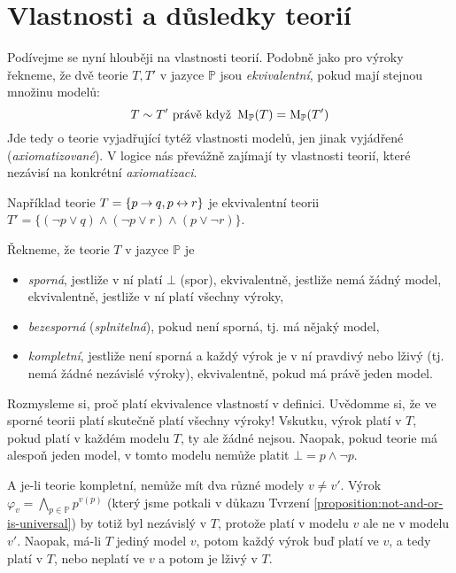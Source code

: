 \section{Vlastnosti a důsledky teorií}

Podívejme se nyní hlouběji na vlastnosti teorií. Podobně jako pro výroky řekneme, že dvě teorie $T,T'$ v jazyce $\mathbb P$ jsou \emph{ekvivalentní}, pokud mají stejnou množinu modelů:
$$
T\sim T' \text{ právě když } \operatorname{M}_\mathbb P(T)=\operatorname{M}_\mathbb P(T')
$$
Jde tedy o teorie vyjadřující tytéž vlastnosti modelů, jen jinak vyjádřené (\emph{axiomatizované}). V logice nás převážně zajímají ty vlastnosti teorií, které nezávisí na konkrétní \emph{axiomatizaci}.

\begin{example}
    Například teorie $T=\{p\mathbin{\rightarrow} q,p\mathbin{\leftrightarrow} r\}$ je ekvivalentní teorii $T'=\{(\neg p\lor q)\land(\neg p\lor r)\land(p\lor\neg r)\}$.
\end{example}

\begin{definition}
Řekneme, že teorie $T$ v jazyce $\mathbb P$ je
\begin{itemize}
    \item \emph{sporná}, jestliže v ní platí $\bot$ (spor), ekvivalentně, jestliže nemá žádný model, ekvivalentně, jestliže v ní platí všechny výroky,
    \item \emph{bezesporná} (\emph{splnitelná}), pokud není sporná, tj. má nějaký model,
    \item \emph{kompletní}, jestliže není sporná a každý výrok je v ní pravdivý nebo lživý (tj. nemá žádné nezávislé výroky), ekvivalentně, pokud má právě jeden model.
\end{itemize}    
\end{definition}

Rozmysleme si, proč platí ekvivalence vlastností v definici. Uvědomme si, že ve sporné teorii platí skutečně platí všechny výroky! Vskutku, výrok platí v $T$, pokud platí v každém modelu $T$, ty ale žádné nejsou. Naopak, pokud teorie má alespoň jeden model, v tomto modelu nemůže platit $\bot=p\land\neg p$.

A je-li teorie kompletní, nemůže mít dva různé modely $v\neq v'$. Výrok $\varphi_{v}=\bigwedge_{p\in\mathbb P}p^{v(p)}$ (který jsme potkali v důkazu Tvrzení \ref{proposition:not-and-or-is-universal}) by totiž byl nezávislý v $T$, protože platí v modelu $v$ ale ne v modelu $v'$. Naopak, má-li $T$ jediný model $v$, potom každý výrok buď platí ve $v$, a tedy platí v $T$, nebo neplatí ve $v$ a potom je lživý v $T$.

